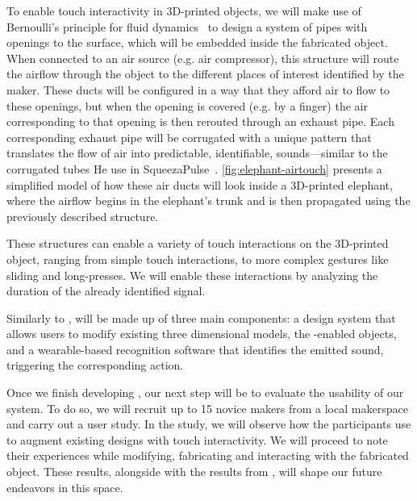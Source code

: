         To enable touch interactivity in 3D-printed objects, we will make use
        of Bernoulli's principle for fluid dynamics~\cite{Bernoulli:1738ut} to
        design a system of pipes with openings to the surface, which will be
        embedded inside the fabricated object. When connected to an air source
        (e.g. air compressor), this structure will route the airflow through
        the object to the different places of interest identified by the maker.
        These ducts will be configured in a way that they afford air to flow to
        these openings, but when the opening is covered (e.g. by a finger) the
        air corresponding to that opening is then rerouted through an exhaust
        pipe. Each corresponding exhaust pipe will be corrugated with a unique
        pattern that translates the flow of air into predictable, identifiable,
        sounds---similar to the corrugated tubes He \etal use in
        SqueezaPulse~\cite{He:2017jc}. \cref{fig:elephant-airtouch} presents a
        simplified model of how these air ducts will look inside a 3D-printed
        elephant, where the airflow begins in the elephant's trunk and is then
        propagated using the previously described structure.

        These structures can enable a variety of touch interactions on the
        3D-printed object, ranging from simple touch interactions, to more
        complex gestures like sliding and long-presses. We will enable these
        interactions by analyzing the duration of the already identified
        signal.

        Similarly to \bh, \at will be made up of three main components: a
        design system that allows users to modify existing three dimensional
        models, the \at-enabled objects, and a wearable-based recognition
        software that identifies the emitted sound, triggering the
        corresponding action.

        Once we finish developing \at, our next step will be to evaluate the
        usability of our system. To do so, we will recruit up to 15 novice
        makers from a local makerspace and carry out a user study. In the
        study, we will observe how the participants use \at to augment existing
        designs with touch interactivity. We will proceed to note their
        experiences while modifying, fabricating and interacting with the
        fabricated object. These results, alongside with the results from \bh,
        will shape our future endeavors in this space.

